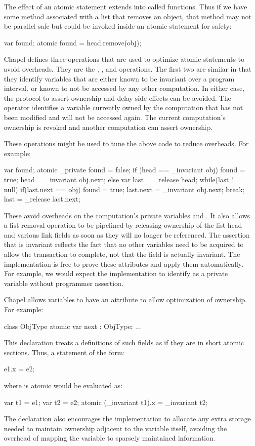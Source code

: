 The effect of an atomic statement extends into called functions. Thus
if we have some method associated with a list that removes an object,
that method may not be parallel safe but could be invoked inside an
atomic statement for safety:
\begin{chapel}
var found;
atomic found = head.remove(obj);
\end{chapel}

Chapel defines three operations that are used to optimize atomic
statements to avoid overheads.  They are the ,
, and  operations. The first two are
similar in that they identify variables that are either known to be
invariant over a program interval, or known to not be accessed by any
other computation. In either case, the protocol to assert ownership
and delay side-effects can be avoided. The  operator
identifies a variable currently owned by the computation that has not
been modified and will not be accessed again. The current
computation's ownership is revoked and another computation can assert
ownership.

These operations might be used to tune the above code to reduce
overheads. For example:
\begin{chapel}
var found;
atomic {
  _private found = false;	   
  if (head == _invariant obj) {
    found = true;
    head = _invariant obj.next;
  } else {
    var last = _release head;
    while(last != null) {
      if(last.next == obj) {
        found = true;
        last.next = _invariant obj.next;
        break;
      }
      last = _release last.next;
    }
  }
}
\end{chapel}
These avoid overheads on the computation's private variables
 and .  It also allows a list-removal operation
to be pipelined by releasing ownership of the list head and various
link fields as soon as they will no longer be referenced. The
assertion that  is invariant reflects the fact that no
other variables need to be acquired to allow the transaction to
complete, not that the field is actually invariant. The implementation
is free to prove these attributes and apply them automatically. For
example, we would expect the implementation to identify  as
a private variable without programmer assertion.

Chapel allows variables to have an  attribute to allow
optimization of ownership. For example:
\begin{chapel}
class ObjType {
  atomic var next : ObjType;
  ...
}
\end{chapel}
This declaration treats a definitions of such fields as if they are in
short atomic sections. Thus, a statement of the form:
\begin{chapel}
e1.x = e2;
\end{chapel}
where  is atomic would be evaluated as:
\begin{chapel}
var t1 = e1;
var t2 = e2;
atomic (_invariant t1).x = _invariant t2;
\end{chapel}

The declaration also encourages the implementation to allocate any
extra storage needed to maintain ownership adjacent to the variable
itself, avoiding the overhead of mapping the variable to sparsely
maintained information.


